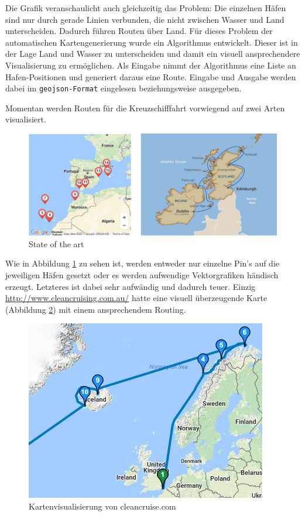 \documentclass[letterpaper]{article}
\begin{document}
	Die Grafik veranschaulicht auch gleichzeitig das Problem: Die einzelnen Häfen sind nur durch gerade Linien verbunden, die nicht zwischen Wasser und Land unterscheiden. Dadurch führen Routen über Land. Für dieses Problem der automatischen Kartengenerierung wurde ein Algorithmus entwickelt. Dieser ist in der Lage Land und Wasser zu unterscheiden und damit ein visuell ansprechendere Visualisierung zu ermöglichen. Als Eingabe nimmt der Algorithmus eine Liste an Hafen-Positionen und generiert daraus eine Route. Eingabe und Ausgabe werden dabei im \texttt{geojson-Format} \cite{rfc7946} eingelesen beziehungsweise ausgegeben.

	Momentan werden Routen für die Kreuzschifffahrt vorwiegend auf zwei Arten visualisiert.

	\begin{figure}[!htb]
		\begin{center}
		\includegraphics[width=\linewidth]{state_of_the_art}
		\caption{State of the art}
		\label{fig:state of the art}
		\end{center}
	\end{figure}

	Wie in Abbildung \ref{fig:state of the art} zu sehen ist, werden entweder nur einzelne Pin's auf die jeweiligen Häfen gesetzt oder es werden aufwendige Vektorgrafiken händisch erzeugt. Letzteres ist dabei sehr aufwändig und dadurch teuer. Einzig \url{http://www.cleancruising.com.au/} hatte eine visuell überzeugende Karte (Abbildung \ref{fig:state of the art cleancruise}) mit einem ansprechendem Routing. 

	\begin{figure}[!htb]
		\begin{center}
		\includegraphics[width=.6\linewidth]{state_of_the_art_cleancruise}
		\caption{Kartenvisualisierung von cleancruise.com}
		\label{fig:state of the art cleancruise}
		\end{center}
	\end{figure}
\end{document}
